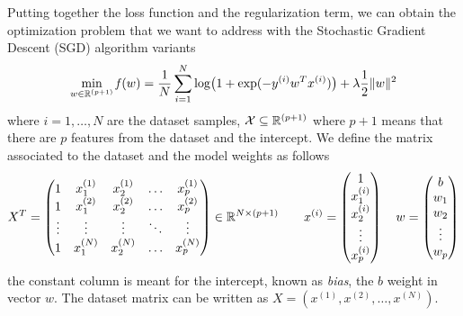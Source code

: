 Putting together the loss function and the regularization term, we can obtain the optimization problem that we want to address with the Stochastic Gradient Descent (SGD) algorithm variants
\begin{equation}\label{eq:opt-prob}
\min_{w\in\mathbb{R}^{(p+1)}}\operatorname*{\mathit{f}}(w)=\frac{1}{N}\sum_{i=1}^N\log\bigl(1+\exp(-y^{(i)}w^Tx^{(i)})\bigr)+\lambda\frac{1}{2}\lVert w\rVert^2
\end{equation}
where $i=1,\dots,N$ are the dataset samples, $\mathcal{X}\subseteq\mathbb{R}^{(p+1)}$ where $p+1$ means that there are $p$ features from the dataset and the intercept. %
We define the matrix associated to the dataset and the model weights as follows
\[
X^T=
\begin{pmatrix}
1 & x_1^{(1)} & x_2^{(1)} & \dots & x_p^{(1)} \\
1 & x_1^{(2)} & x_2^{(2)} & \dots & x_p^{(2)} \\
\vdots & \vdots & \vdots & \ddots & \vdots \\
1 & x_1^{(N)} & x_2^{(N)} & \dots & x_p^{(N)}
\end{pmatrix}\in\mathbb{R}^{N\times(p+1)}\qquad
x^{(i)}=
\begin{pmatrix}
1 \\ x_1^{(i)} \\ x_2^{(i)} \\ \vdots \\ x_p^{(i)}
\end{pmatrix}\quad
w=
\begin{pmatrix}
b \\ w_1 \\ w_2 \\ \vdots \\ w_p
\end{pmatrix}
\]
the constant column is meant for the intercept, known as \emph{bias}, the $b$ weight in vector $w$. The dataset matrix can be written as $X=(x^{(1)},x^{(2)},\dots,x^{(N)})$.%

